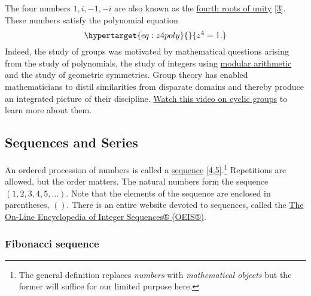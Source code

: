 \documentclass[
  a4paper,
]{article}
\begin{document}
The four numbers \(1, i, -1, -i\) are also known as the
\href{https://mathworld.wolfram.com/RootofUnity.html}{fourth roots of
unity} {[}\protect\hyperlink{ref-honner2021}{3}{]}. These numbers
satisfy the polynomial equation
\begin{equation}\protect\hypertarget{eq:z4poly}{}{
z^4 = 1.
}\label{eq:z4poly}\end{equation} Indeed, the study of groups was
motivated by mathematical questions arising from the study of
polynomials, the study of integers using
\href{https://en.wikipedia.org/wiki/Modular_arithmetic}{modular
arithmetic} and the study of geometric symmetries. Group theory has
enabled mathematicians to distil similarities from disparate domains and
thereby produce an integrated picture of their discipline.
\href{https://www.youtube.com/watch?v=8A84sA1YuPw}{Watch this video on
cyclic groups} to learn more about them.

\hypertarget{sequences-and-series}{%
\subsection{Sequences and Series}\label{sequences-and-series}}

An ordered procession of numbers is called a
\href{https://en.wikipedia.org/w/index.php?title=Sequence&oldid=1177801065}{sequence}
{[}\protect\hyperlink{ref-wikisequence}{4},\protect\hyperlink{ref-wolframsequence}{5}{]}.\footnote{The
  general definition replaces \emph{numbers} with \emph{mathematical
  objects} but the former will suffice for our limited purpose here.}
Repetitions are allowed, but the order matters. The natural numbers form
the sequence \((1, 2, 3, 4, 5, \ldots)\). Note that the elements of the
sequence are enclosed in parentheses, \(()\). There is an entire website
devoted to sequences, called the \href{https://oeis.org/}{The On-Line
Encyclopedia of Integer Sequences® (OEIS®)}.

\hypertarget{fibonacci-sequence}{%
\subsubsection{Fibonacci sequence}\label{fibonacci-sequence}}
\end{document}
